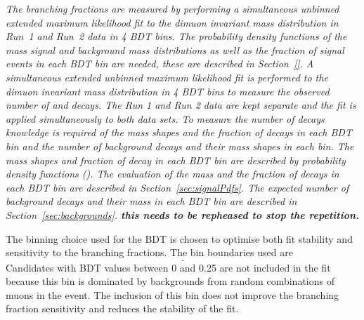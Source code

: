 {\it The branching fractions are measured by performing a simultaneous unbinned extended maximum likelihood fit to the dimuon invariant mass distribution in Run~1 and Run~2 data in 4 BDT bins. The probability density functions of the mass signal and background mass distributions as well as the fraction of signal events in each BDT bin are needed, these are described in Section~\ref{}. 
A simultaneous extended unbinned maximum likelihood fit is performed to the dimuon invariant mass distribution in 4 BDT bins to measure the observed number of \bdmumu and \bsmumu decays. The Run 1 and Run 2 data are kept separate and the fit is applied simultaneously to both data sets. To measure the number of \bmumu decays knowledge is required of the mass shapes and the fraction of \bmumu decays in each BDT bin and the number of background decays and their mass shapes in each bin. The mass shapes and fraction of \bmumu decay in each BDT bin are described by probability density functions (\pdfs). The evaluation of the \bmumu mass \pdfs and the fraction of decays in each BDT bin are described in Section~\ref{sec:signalPdfs}. The expected number of background decays and their mass \pdfs in each BDT bin are described in Section~\ref{sec:backgrounds}.  {\bf this needs to be repheased to stop the repetition.}

The binning choice used for the BDT is chosen to optimise both fit stability and sensitivity to the \bmumu branching fractions. The bin boundaries used are
\begin{equation}
[0.25, 0.4, 0.5, 0.6, 1.0].
\label{eq:BDTbins}
\end{equation}
Candidates with BDT values between 0 and 0.25 are not included in the fit because this bin is dominated by backgrounds from random combinations of muons in the event. The inclusion of this bin does not improve the branching fraction sensitivity and reduces the stability of the fit. %

}
